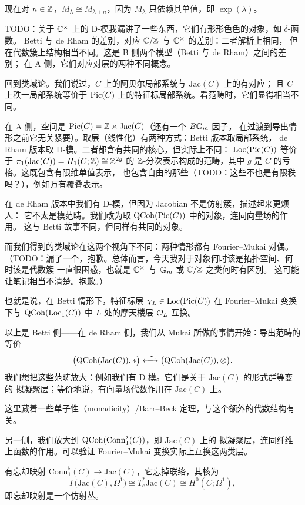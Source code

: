 现在对 $n\in\mathbb{Z}$，$M_\lambda\cong M_{\lambda+n}$，因为 $M_\lambda$ 只依赖其单值，即 $\exp(\lambda)$。

TODO：关于 $\mathbb{C}^\times$ 上的 D-模我漏讲了一些东西，它们有形形色色的对象，如 $\delta$-函数。
Betti 与 de Rham 的差别，对应 $\mathbb{C}/\mathbb{Z}$ 与 $\mathbb{C}^\times$ 的差别：二者解析上相同，
但在代数簇上结构相当不同。这是 B 侧两个模型（Betti 与 de Rham）之间的差别；
在 A 侧，它们对应对层的两种不同概念。

回到类域论。我们说过，$C$ 上的阿贝尔局部系统与 $\mathrm{Jac}(C)$ 上的有对应；
且 $C$ 上秩一局部系统等价于 $\operatorname{Pic}(C)$ 上的特征标局部系统。看范畴时，它们显得相当不同。

在 A 侧，空间是 $\operatorname{Pic}(C)=\mathbb{Z}\times\mathrm{Jac}(C)$（还有一个 $B\mathbb{G}_m$ 因子，
在过渡到导出情形之前它无关紧要）。取层（线性化）有两种方式：Betti 版本取局部系统，
de Rham 版本取 D-模。二者都含有共同的核心，但实际上不同：
$\mathrm{Loc}(\operatorname{Pic}(C))$ 等价于 $\pi_1(\mathrm{Jac}(C))=H_1(C;\mathbb{Z})\cong\mathbb{Z}^{2g}$ 的
$\mathbb{Z}$-分次表示构成的范畴，其中 $g$ 是 $C$ 的亏格。这既包含有限维单值表示，
也包含自由的那些（TODO：这些不也是有限秩吗？），例如万有覆叠表示。

在 de Rham 版本中我们有 D-模，但因为 Jacobian 不是仿射簇，描述起来更烦人：
它不太是模范畴。我们改为取 $\mathrm{QCoh}(\operatorname{Pic}(C))$ 中的对象，连同向量场的作用。
这与 Betti 故事不同，但同样有共同的对象。

而我们得到的类域论在这两个视角下不同：两种情形都有 Fourier–Mukai 对偶。
（TODO：漏了一个，抱歉。总体而言，今天我对于对象何时该是拓扑空间、何时该是代数簇
一直很困惑，也就是 $\mathbb{C}^\times$ 与 $\mathbb{G}_m$ 或 $\mathbb{C}/\mathbb{Z}$ 之类何时有区别。
这可能让笔记相当不清楚。抱歉。）

也就是说，在 Betti 情形下，特征标层 $\chi_L\in\mathrm{Loc}(\operatorname{Pic}(C))$
在 Fourier–Mukai 变换下与 $\mathrm{QCoh}(\mathrm{Loc}_1(C))$ 中 $L$ 处的摩天楼层
$\mathcal{O}_L$ 互换。

以上是 Betti 侧——在 de Rham 侧，我们从 Mukai 所做的事情开始：导出范畴的等价
\[
\bigl(\mathrm{QCoh}(\mathrm{Jac}(C)),*\bigr)
\xleftrightarrow{\ \simeq\ }
\bigl(\mathrm{QCoh}(\mathrm{Jac}(C)),\otimes\bigr).
\]
我们想把这些范畴放大：例如我们有 D-模。它们是关于 $\mathrm{Jac}(C)$ 的形式群等变的
拟凝聚层；等价地说，有向量场代数作用在 $\mathrm{Jac}(C)$ 上。

这里藏着一些单子性（monadicity）/Barr–Beck 定理，与这个额外的代数结构有关。

另一侧，我们放大到 $\mathrm{QCoh}(\mathrm{Conn}^{\flat}_1(C))$，即 $\mathrm{Jac}(C)$ 上的
拟凝聚层，连同纤维上函数的作用。可以验证 Fourier–Mukai 变换实际上互换这两类层。

有忘却映射 $\mathrm{Conn}^{\flat}_1(C)\to\mathrm{Jac}(C)$，它忘掉联络，其核为
\[
\Gamma\bigl(\mathrm{Jac}(C),\Omega^1\bigr)
\cong T^*_e\mathrm{Jac}(C)\cong H^0(C;\Omega^1),
\]
即忘却映射是一个仿射丛。

